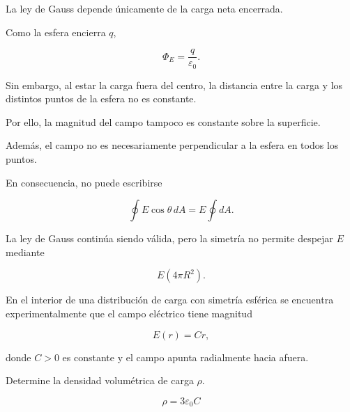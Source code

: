 \begin{explicacion}

La ley de Gauss depende únicamente de la carga neta encerrada.

Como la esfera encierra \(q\),

\[
\boxed{
\Phi_E=\frac{q}{\varepsilon_0}
}.
\]

Sin embargo, al estar la carga fuera del centro, la distancia entre la carga y los
distintos puntos de la esfera no es constante.

Por ello, la magnitud del campo tampoco es constante sobre la superficie.

Además, el campo no es necesariamente perpendicular a la esfera en todos los puntos.

En consecuencia, no puede escribirse

\[
\oint E\cos\theta\,dA
=
E\oint dA.
\]

La ley de Gauss continúa siendo válida, pero la simetría no permite despejar \(E\)
mediante

\[
E(4\pi R^2).
\]

\end{explicacion}


\begin{ejercicio}

En el interior de una distribución de carga con simetría esférica se encuentra
experimentalmente que el campo eléctrico tiene magnitud

\[
E(r)=Cr,
\]

donde \(C>0\) es constante y el campo apunta radialmente hacia afuera.

Determine la densidad volumétrica de carga \(\rho\).

\end{ejercicio}

\begin{respuesta}

\[
\boxed{\rho=3\varepsilon_0C}
\]

\end{respuesta}

